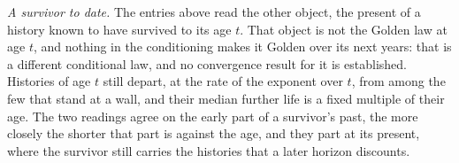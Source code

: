 \emph{A survivor to date.} The entries above read the other object, the
present of a history known to have survived to its age $t$. That object is
not the Golden law at age $t$, and nothing in the conditioning makes it
Golden over its next years: that is a different conditional law, and no convergence result for it is established. Histories of age $t$ still depart,
at the rate of the exponent over $t$, from among the few that stand at a
wall, and their median further life is a fixed multiple of their age. The
two readings agree on the early part of a survivor's past, the more
closely the shorter that part is against the age, and they part at its
present, where the survivor still carries the histories that a later
horizon discounts.
